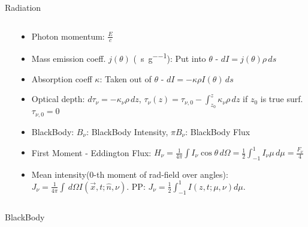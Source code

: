 \begin{frame}{Radiation}
\begin{columns}[T]
\begin{column}{0.6\textwidth}
        \end{column}
        \begin{column}{0.4\textwidth}
            \begin{itemize}
                \item Photon momentum: $\frac{E}{c}$
                \item Mass emission coeff. $j(\theta)$ (\si{\erg\per\second\per\gram}): Put into $\theta$ - $dI=j(\theta)\rho\,ds$
                \item Absorption coeff $\kappa$: Taken out of $\theta$ - $dI=-\kappa\rho I(\theta)\,ds$
                \item Optical depth: $d\tau_{\nu}=-\kappa_{\nu}\rho\,dz$, $\tau_{\nu}(z)=\tau_{\nu,0}-\int_{z_0}^z\kappa_{\nu}\rho\,dz$ if $z_0$ is true surf. $\tau_{\nu,0}=0$
                \item BlackBody: $B_{\nu}$: BlackBody Intensity, $\pi B_{\nu}$: BlackBody Flux
                \item First Moment - Eddington Flux: $H_{\nu}=\frac{1}{4\pi}\int I_{\nu}\cos{\theta}\,d\Omega=\frac{1}{2}\int_{-1}^1I_{\nu}\mu\,d\mu=\frac{F_{\nu}}{4}$
                \item Mean intensity(0-th moment of rad-field over angles): $J_{\nu}=\frac{1}{4\pi}\int\,d\Omega I(\vec{x},t;\hat{n},\nu)$. PP: $J_{\nu}=\frac{1}{2}\int_{-1}^1I(z,t;\mu,\nu)d\mu$.
                \end{itemize}
        \end{column}
    \end{columns}
    
\end{frame}

\begin{frame}{BlackBody}
    
\end{frame}

